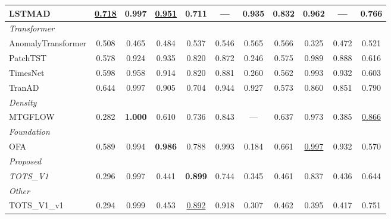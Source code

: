 \begin{table}[t]
\begin{tabular}{lcccccccccc}
LSTMAD & \underline{0.718} & 0.997 & \underline{0.951} & 0.711 & --- & \textbf{0.935} & \textbf{0.832} & 0.962 & --- & 0.766 \\
\midrule
\multicolumn{11}{l}{\textit{Transformer}} \\
AnomalyTransformer & 0.508 & 0.465 & 0.484 & 0.537 & 0.546 & 0.565 & 0.566 & 0.325 & 0.472 & 0.521 \\
PatchTST & 0.578 & 0.924 & 0.935 & 0.820 & 0.872 & 0.246 & 0.575 & 0.989 & 0.888 & 0.616 \\
TimesNet & 0.598 & 0.958 & 0.914 & 0.820 & 0.881 & 0.260 & 0.562 & 0.993 & 0.932 & 0.603 \\
TranAD & 0.644 & 0.997 & 0.905 & 0.704 & 0.944 & 0.927 & 0.573 & 0.860 & 0.851 & 0.790 \\
\midrule
\multicolumn{11}{l}{\textit{Density}} \\
MTGFLOW & 0.282 & \textbf{1.000} & 0.610 & 0.736 & 0.843 & --- & 0.637 & 0.973 & 0.385 & \underline{0.866} \\
\midrule
\multicolumn{11}{l}{\textit{Foundation}} \\
OFA & 0.589 & 0.994 & \textbf{0.986} & 0.788 & 0.993 & 0.184 & 0.661 & \underline{0.997} & 0.932 & 0.570 \\
\midrule
\multicolumn{11}{l}{\textit{Proposed}} \\
\textit{TOTS\_V1} & 0.296 & 0.997 & 0.441 & \textbf{0.899} & 0.744 & 0.345 & 0.461 & 0.837 & 0.436 & 0.644 \\
\midrule
\multicolumn{11}{l}{\textit{Other}} \\
TOTS\_V1\_v1 & 0.294 & 0.999 & 0.453 & \underline{0.892} & 0.918 & 0.307 & 0.462 & 0.395 & 0.417 & 0.751 \\
\bottomrule
\end{tabular}
\end{table}
